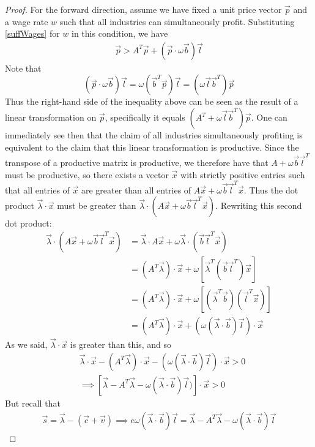 \documentclass{article}
\theoremstyle{definition}
\theoremstyle{plain}
\theoremstyle{theorem}
\begin{document}
\begin{proof}
	For the forward direction, assume we have fixed a unit price vector $\vec{p}$ and a wage rate $w$ such that all industries can simultaneously profit. Substituting \ref{suffWages} for $w$ in this condition, we have
\begin{align*}
	\vec{p} > A^T\vec{p} + (\vec{p}\cdot \omega \vec{b})\vec{l} \label{profitability} 
\end{align*} 
Note that 
\[ (\vec{p} \cdot \omega \vec{b}) \vec{l} = \omega (\vec{b}^T \vec{p})\vec{l} = (\omega \vec{l} \vec{b}^T)\vec{p} \]
Thus the right-hand side of the inequality above can be seen as the result of a linear transformation on $\vec{p}$, specifically it equals $(A^T + \omega \vec{l} \vec{b}^T)\vec{p}$. One can immediately see then that the claim of all industries simultaneously profiting is equivalent to the claim that this linear transformation is productive. Since the transpose of a productive matrix is productive, we therefore have that $A+\omega\vec{b}\vec{l}^T$ must be productive, so there exists a vector $\vec{x}$ with strictly positive entries such that all entries of $\vec{x}$ are greater than all entries of $A\vec{x} + \omega\vec{b}\vec{l}^T\vec{x}$. Thus the dot product $\vec{\lambda}\cdot\vec{x}$ must be greater than $\vec{\lambda}\cdot (A\vec{x} + \omega\vec{b}\vec{l}^T\vec{x})$. Rewriting this second dot product:
\begin{align*}
	\vec{\lambda}\cdot (A\vec{x} + \omega\vec{b}\vec{l}^T\vec{x}) &= \vec{\lambda}\cdot A\vec{x} + \omega\vec{\lambda} \cdot (\vec{b}\vec{l}^T\vec{x}) \\
	&= (A^T\vec{\lambda})\cdot \vec{x} + \omega[\vec{\lambda}^T(\vec{b}\vec{l}^T)\vec{x}] \\
	&= (A^T\vec{\lambda})\cdot \vec{x} + \omega[(\vec{\lambda}^T\vec{b})(\vec{l}^T\vec{x})] \\
	&= (A^T\vec{\lambda})\cdot \vec{x} + (\omega(\vec{\lambda}\cdot\vec{b})\vec{l})\cdot\vec{x}
\end{align*}
As we said, $\vec{\lambda}\cdot\vec{x}$ is greater than this, and so
\begin{align*}
	& \vec{\lambda}\cdot\vec{x} - (A^T\vec{\lambda})\cdot \vec{x} - (\omega(\vec{\lambda}\cdot\vec{b})\vec{l})\cdot\vec{x} > 0 \\
	&\implies [\vec{\lambda} - A^T\vec{\lambda} - \omega(\vec{\lambda}\cdot\vec{b})\vec{l})]\cdot\vec{x} > 0
\end{align*} 
But recall that 
\begin{align*}
 \vec{s} = \vec{\lambda} - (\vec{c}+\vec{v}) \implies e\omega(\vec{\lambda}\cdot\vec{b})\vec{l} = \vec{\lambda} - A^T\vec{\lambda} - \omega(\vec{\lambda}\cdot\vec{b})\vec{l}

\end{align*}
\end{proof}
\end{document}
